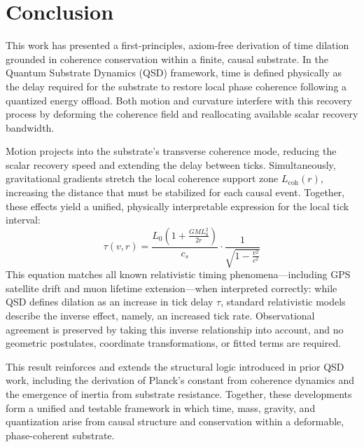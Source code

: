\documentclass[entropy,article,submit,pdftex,moreauthors]{Definitions/mdpi}
\begin{document}
\section{Conclusion}

This work has presented a first-principles, axiom-free derivation of time dilation grounded in coherence conservation within a finite, causal substrate. In the Quantum Substrate Dynamics (QSD) framework, time is defined physically as the delay required for the substrate to restore local phase coherence following a quantized energy offload. Both motion and curvature interfere with this recovery process by deforming the coherence field and reallocating available scalar recovery bandwidth.

Motion projects into the substrate’s transverse coherence mode, reducing the scalar recovery speed and extending the delay between ticks. Simultaneously, gravitational gradients stretch the local coherence support zone \( L_{\text{coh}}(r) \), increasing the distance that must be stabilized for each causal event. Together, these effects yield a unified, physically interpretable expression for the local tick interval:
\[
\tau(v, r) =
\frac{L_0 \left(1 + \frac{GM L_0^2}{2r} \right)}{c_s}
\cdot \frac{1}{\sqrt{1 - \frac{v^2}{c^2}}}
\]
This equation matches all known relativistic timing phenomena—including GPS satellite drift and muon lifetime extension—when interpreted correctly: while QSD defines dilation as an increase in tick delay \( \tau \), standard relativistic models describe the inverse effect, namely, an increased tick rate. Observational agreement is preserved by taking this inverse relationship into account, and no geometric postulates, coordinate transformations, or fitted terms are required.

This result reinforces and extends the structural logic introduced in prior QSD work, including the derivation of Planck’s constant from coherence dynamics and the emergence of inertia from substrate resistance. Together, these developments form a unified and testable framework in which time, mass, gravity, and quantization arise from causal structure and conservation within a deformable, phase-coherent substrate.




\vspace{6pt} 

\end{document}
